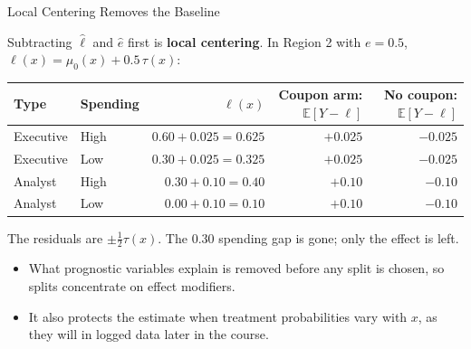 \documentclass[aspectratio=169, 11pt, handout]{beamer}
\newcommand{\E}{\mathbb{E}}
\begin{document}
\begin{frame}{Local Centering Removes the Baseline}

Subtracting $\hat\ell$ and $\hat e$ first is \textbf{local centering}. In Region 2 with $e = 0.5$, $\ell(x) = \mu_0(x) + 0.5\,\tau(x)$:

\begin{center}
\small
\begin{tabular}{llrrr}
\toprule
\textbf{Type} & \textbf{Spending} & $\ell(x)$ & \textbf{Coupon arm: $\E[Y - \ell]$} & \textbf{No coupon: $\E[Y - \ell]$} \\
\midrule
Executive & High & $0.60 + 0.025 = 0.625$ & $+0.025$ & $-0.025$ \\
Executive & Low  & $0.30 + 0.025 = 0.325$ & $+0.025$ & $-0.025$ \\
Analyst   & High & $0.30 + 0.10 = 0.40$ & $+0.10$ & $-0.10$ \\
Analyst   & Low  & $0.00 + 0.10 = 0.10$ & $+0.10$ & $-0.10$ \\
\bottomrule
\end{tabular}
\end{center}

\medskip

The residuals are $\pm\tfrac12\tau(x)$. The $0.30$ spending gap is gone; only the effect is left.

\bigskip

\begin{itemize}
  \item What prognostic variables explain is removed before any split is chosen, so splits concentrate on effect modifiers.
  \item It also protects the estimate when treatment probabilities vary with $x$, as they will in logged data later in the course.
\end{itemize}
\end{frame}
\end{document}
